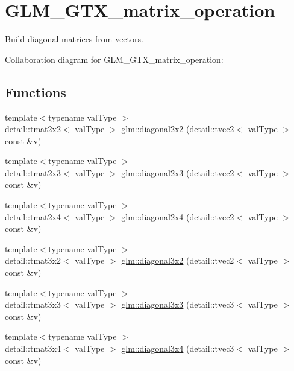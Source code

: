 \hypertarget{group__gtx__matrix__operation}{}\section{G\+L\+M\+\_\+\+G\+T\+X\+\_\+matrix\+\_\+operation}
\label{group__gtx__matrix__operation}


Build diagonal matrices from vectors.  


Collaboration diagram for G\+L\+M\+\_\+\+G\+T\+X\+\_\+matrix\+\_\+operation\+:
\subsection*{Functions}
\begin{DoxyCompactItemize}
\item 
{\footnotesize template$<$typename val\+Type $>$ }\\detail\+::tmat2x2$<$ val\+Type $>$ \hyperlink{group__gtx__matrix__operation_gabe577b7504108952eb7a6dad10699cc0}{glm\+::diagonal2x2} (detail\+::tvec2$<$ val\+Type $>$ const \&v)
\item 
{\footnotesize template$<$typename val\+Type $>$ }\\detail\+::tmat2x3$<$ val\+Type $>$ \hyperlink{group__gtx__matrix__operation_gada165842cf06dc7224850b7408576b25}{glm\+::diagonal2x3} (detail\+::tvec2$<$ val\+Type $>$ const \&v)
\item 
{\footnotesize template$<$typename val\+Type $>$ }\\detail\+::tmat2x4$<$ val\+Type $>$ \hyperlink{group__gtx__matrix__operation_gabe9910eda35b16bfe455d11b3f946d37}{glm\+::diagonal2x4} (detail\+::tvec2$<$ val\+Type $>$ const \&v)
\item 
{\footnotesize template$<$typename val\+Type $>$ }\\detail\+::tmat3x2$<$ val\+Type $>$ \hyperlink{group__gtx__matrix__operation_gaf0d798eaf2ae1a04e943e34ca6650ff7}{glm\+::diagonal3x2} (detail\+::tvec2$<$ val\+Type $>$ const \&v)
\item 
{\footnotesize template$<$typename val\+Type $>$ }\\detail\+::tmat3x3$<$ val\+Type $>$ \hyperlink{group__gtx__matrix__operation_ga3abe19ac33f7210ca982c0b474772bac}{glm\+::diagonal3x3} (detail\+::tvec3$<$ val\+Type $>$ const \&v)
\item 
{\footnotesize template$<$typename val\+Type $>$ }\\detail\+::tmat3x4$<$ val\+Type $>$ \hyperlink{group__gtx__matrix__operation_ga113fa9ed40e506a12b5aea2c9b75afca}{glm\+::diagonal3x4} (detail\+::tvec3$<$ val\+Type $>$ const \&v)

\end{DoxyCompactItemize}
